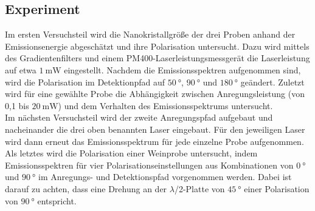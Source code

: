 \subsection{Experiment}
\label{sec:Experiment}
Im ersten Versuchsteil wird die Nanokristallgröße der drei Proben anhand der Emissionsenergie
abgeschätzt und ihre Polarisation untersucht. Dazu wird mittels des Gradientenfilters
und einem PM400-Laserleistungsmessgerät die Laserleistung auf etwa $\SI{1}{\milli\watt}$
eingestellt. Nachdem die Emissionsspektren aufgenommen sind, wird die Polarisation
im Detektionpfad auf $\SI{50}{\degree}$, $\SI{90}{\degree}$ und $\SI{180}{\degree}$
geändert.
Zuletzt wird für eine gewählte Probe die Abhängigkeit zwischen Anregungsleistung
(von 0,1 bis $\SI{20}{\milli\watt}$) und dem Verhalten des Emissionsspektrums
untersucht.\\
Im nächsten Versuchsteil wird der zweite Anregungspfad aufgebaut und
nacheinander die drei oben benannten Laser eingebaut. Für den jeweiligen Laser
wird dann erneut das Emissionsspektrum für jede einzelne Probe aufgenommen.\\
Als letztes wird die Polarisation einer Weinprobe untersucht, indem Emissionsspektren
für vier Polarisationseinstellungen aus Kombinationen von $\SI{0}{\degree}$ und $\SI{90}{\degree}$
im Anregungs- und Detektionspfad vorgenommen werden. Dabei ist darauf zu achten,
dass eine Drehung an der  $\lambda$/2-Platte von $\SI{45}{\degree}$ einer Polarisation
von $\SI{90}{\degree}$ entspricht.
